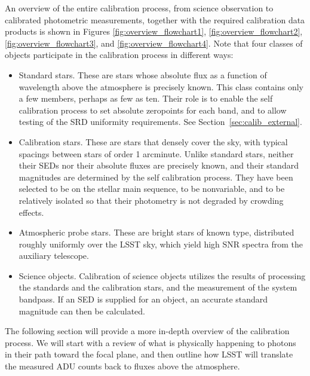 \documentclass[12pt,preprint]{aastex}
\begin{document}
An overview of the entire calibration process, from science observation
to calibrated photometric measurements, together with the required
calibration data products is shown in
Figures \ref{fig:overview_flowchart1}, \ref{fig:overview_flowchart2}, 
\ref{fig:overview_flowchart3}, and \ref{fig:overview_flowchart4}.  
Note that four classes of objects participate in the calibration process in different ways:
\begin{itemize}
\item Standard stars.  These are stars whose absolute flux as a function of wavelength above the atmosphere is precisely known.  This class contains only a few members, perhaps as few as ten.  Their role is to enable the self calibration process to set absolute zeropoints for each band, and to allow testing of the SRD uniformity requirements.  See Section~\ref{sec:calib_external}.
\item Calibration stars.  These are stars that densely cover the sky, with typical spacings between stars of order 1 arcminute.  Unlike standard stars, neither their SEDs nor their absolute fluxes are precisely known, and their standard magnitudes are determined by the self calibration process.   They have been selected to be on the stellar main sequence, to be nonvariable, and to be relatively isolated so that their photometry is not degraded by crowding effects.
\item Atmospheric probe stars.   These are bright stars of known type, distributed roughly uniformly over the LSST sky, which yield high SNR spectra from the auxiliary telescope.  
\item Science objects.  Calibration of science objects utilizes the results of processing the standards and the calibration stars, and the measurement of the system bandpass.   If an SED is supplied for an object, an accurate standard magnitude can then be calculated.
\end{itemize}

The following section will provide a more in-depth overview of the
calibration process. We will start with a review of what
is physically happening to photons in their path toward the focal
plane, and then outline how LSST will translate the
measured ADU counts back to fluxes above the atmosphere.
\end{document}
